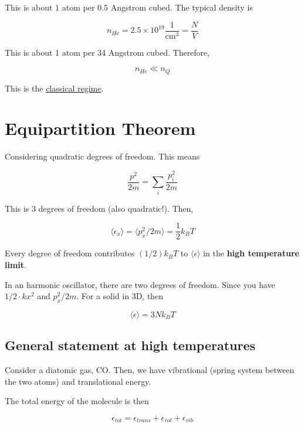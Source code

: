 \documentclass{article}
\newtheorem{one minute paper}[theorem]{One Minute Paper}
\begin{document}
This is about 1 atom per 0.5 Angstrom cubed. The typical density is 

\begin{equation}
    n_{He} = 2.5 \times 10^{19} \frac{1}{\text{cm}^3}= \frac{N}{V} 
\end{equation}

This is about 1 atom per 34 Angstrom cubed. Therefore,

\begin{equation}
    n_{He} \ll n_Q
\end{equation}

This is the \underline{classical regime}.

\section*{Equipartition Theorem}
Considering quadratic degrees of freedom. This means 

\begin{equation}
    \frac{p^2}{2m} = \sum_i \frac{p_i^2}{2m}
\end{equation}

This is 3 degrees of freedom (also quadratic!). Then, 

\begin{equation}
    \langle \epsilon_x \rangle = \langle p_x^2/2m\rangle = \frac{1}{2}k_B T
\end{equation}

Every degree of freedom contributes $(1/2) k_B T$ to $\langle \epsilon \rangle$ in the \textbf{high temperature limit}.

In an harmonic oscillator, there are two degrees of freedom. Since you have $1/2 \cdot k x^2$ and $p_x^2/2m$. For a solid in 3D, then 

\begin{equation}
    \langle \epsilon \rangle = 3Nk_B T
\end{equation}

\subsection*{General statement at high temperatures}

Consider a diatomic gas, CO. Then, we have vibrational (spring system between the two atoms) and translational energy.

The total energy of the molecule is then 

\begin{equation}
    \epsilon_{tot} = \epsilon_{trans} + \epsilon_{rot} + \epsilon_{vib}
\end{equation}
\end{document}
